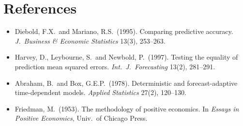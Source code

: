 \documentclass[11pt]{article}
\begin{document}
\section*{References}
\begin{itemize}\itemsep0pt
\item Diebold, F.X.\ and Mariano, R.S.\ (1995). Comparing predictive accuracy.
      \emph{J.\ Business \& Economic Statistics} 13(3), 253--263.
\item Harvey, D., Leybourne, S.\ and Newbold, P.\ (1997). Testing the equality of
      prediction mean squared errors. \emph{Int.\ J.\ Forecasting} 13(2), 281--291.
\item Abraham, B.\ and Box, G.E.P.\ (1978). Deterministic and forecast-adaptive
      time-dependent models. \emph{Applied Statistics} 27(2), 120--130.
\item Friedman, M.\ (1953). The methodology of positive economics. In
      \emph{Essays in Positive Economics}, Univ.\ of Chicago Press.
\end{itemize}
\end{document}
